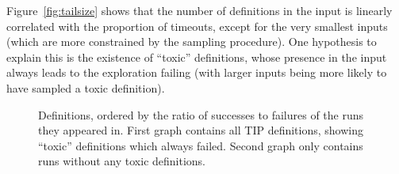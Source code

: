 Figure~\ref{fig:tailsize} shows that the number of definitions in the input is
linearly correlated with the proportion of timeouts, except for the very
smallest inputs (which are more constrained by the sampling procedure). One
hypothesis to explain this is the existence of ``toxic'' definitions, whose
presence in the input always leads to the exploration failing (with larger
inputs being more likely to have sampled a toxic definition).

\begin{figure}
  \scalebox{0.45}{}
  \scalebox{0.45}{}
  \caption{Definitions, ordered by the ratio of successes to failures of the
    runs they appeared in. First graph contains all TIP definitions, showing
    ``toxic'' definitions which always failed. Second graph only contains runs
    without any toxic definitions.}
  \label{fig:proportions}
\end{figure}


